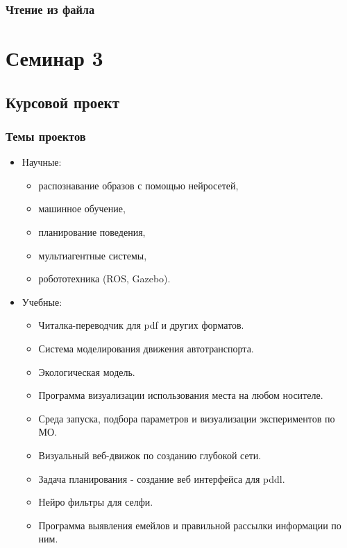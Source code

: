 \documentclass[default]{beamer}
\begin{document}
\begin{frame}
	\frametitle{Чтение из файла}
	
	\lstFileRead
\end{frame}

	\section{Семинар 3}
	\subsection{Курсовой проект}
	
	\begin{frame}
		\frametitle{Темы проектов}
		
		\begin{itemize}
			\item Научные:
			\begin{itemize}
				\item распознавание образов с помощью нейросетей,
				\item машинное обучение,
				\item планирование поведения,
				\item мультиагентные системы,
				\item робототехника (ROS, Gazebo).
			\end{itemize}
			\item Учебные:
			\begin{itemize}
				\item Читалка-переводчик для pdf и других форматов.
				\item Система моделирования движения автотранспорта.
				\item Экологическая модель.
				\item Программа визуализации использования места на любом носителе.
				\item Среда запуска, подбора параметров и визуализации экспериментов по МО.
				\item Визуальный веб-движок по созданию глубокой сети.
				\item Задача планирования - создание веб интерфейса для pddl.
				\item Нейро фильтры для селфи.
				\item Программа выявления емейлов и правильной рассылки информации по ним.
			\end{itemize}
		\end{itemize}
	\end{frame}
		
\end{document}
